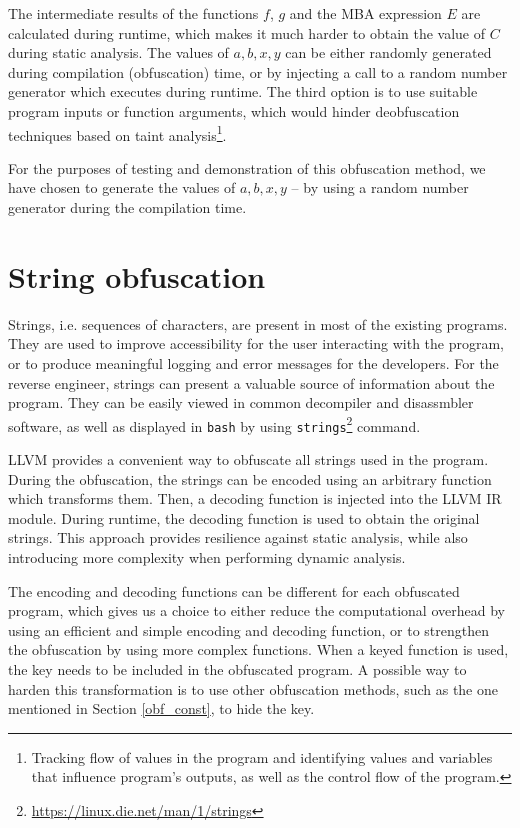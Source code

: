 \documentclass[
  digital, %
  notable,   %
  twoside, %
  nolof,     %
  nolot,     %
]{fithesis3}
\theoremstyle{definition}
\begin{document}
The intermediate results of the functions $f$, $g$ and the MBA expression $E$ are calculated during runtime, which makes it much harder to obtain the value of $C$ during static analysis. The values of $a,b,x,y$ can be either randomly generated during compilation (obfuscation) time,  or by injecting a call to a random number generator which executes during runtime. The third option is to use suitable program inputs or function arguments, which would hinder deobfuscation techniques based on taint analysis\footnote{Tracking flow of values in the program and identifying values and variables that influence program's outputs, as well as the control flow of the program.}. 

For the purposes of testing and demonstration of this obfuscation method, we have chosen to generate the values of $a,b,x,y$ -- by using a random number generator during the compilation time.

\section{String obfuscation}

Strings, i.e. sequences of characters, are present in most of the existing programs. They are used to improve accessibility for the user interacting with the program, or to produce meaningful logging and error messages for the developers. For the reverse engineer, strings can present a valuable source of information about the program. They can be easily viewed in common decompiler and disassmbler software, as well as displayed in \texttt{bash} by using \texttt{strings}\footnote{\url{https://linux.die.net/man/1/strings}} command.

LLVM provides a convenient way to obfuscate all strings used in the program. During the obfuscation, the strings can be encoded using an arbitrary function which transforms them. Then, a decoding function is injected into the LLVM IR module. During runtime, the decoding function is used to obtain the original strings. This approach provides resilience against static analysis, while also introducing more complexity when performing dynamic analysis. 

The encoding and decoding functions can be different for each obfuscated program, which gives us a choice to either reduce the computational overhead by using an efficient and simple encoding and decoding function, or to strengthen the obfuscation by using more complex functions. When a keyed function is used, the key needs to be included in the obfuscated program. A possible way to harden this transformation is to use other obfuscation methods, such as the one mentioned in Section \ref{obf_const}, to hide the key.
\end{document}
